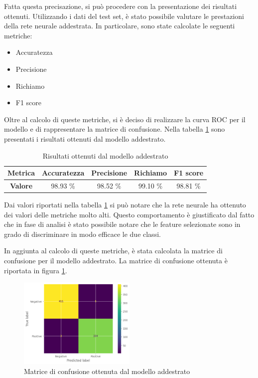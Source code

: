 Fatta questa precisazione, si può procedere con la presentazione dei risultati
ottenuti. Utilizzando i dati del test set, è stato possibile valutare le
prestazioni della rete neurale addestrata. In particolare, sono state calcolate
le seguenti metriche:
\begin{itemize}
    \item Accuratezza
    \item Precisione
    \item Richiamo
    \item F1 score
\end{itemize}
Oltre al calcolo di queste metriche, si è deciso di realizzare la curva ROC per
il modello e di rappresentare la matrice di confusione. Nella tabella
\ref{tab:risultatiReteNeurale} sono presentati i risultati ottenuti dal modello
addestrato.
\begin{table}[!ht]
    \centering
    \begin{tabular}{@{}cllll@{}}
        \toprule
        \rowcolor[HTML]{EFEFEF}
        \textbf{Metrica}                        & \textbf{Accuratezza}         & \textbf{Precisione}          & \textbf{Richiamo}            & \textbf{F1 score}            \\ \midrule
        \cellcolor[HTML]{EFEFEF}\textbf{Valore} & \multicolumn{1}{c}{98.93 \%} & \multicolumn{1}{c}{98.52 \%} & \multicolumn{1}{c}{99.10 \%} & \multicolumn{1}{c}{98.81 \%} \\ \bottomrule
    \end{tabular}
    \caption{Risultati ottenuti dal modello addestrato}
    \label{tab:risultatiReteNeurale}
\end{table}

Dai valori riportati nella tabella \ref{tab:risultatiReteNeurale} si può notare
che la rete neurale ha ottenuto dei valori delle metriche molto alti. Questo
comportamento è giustificato dal fatto che in fase di analisi è stato possibile
notare che le feature selezionate sono in grado di discriminare in modo efficace
le due classi.

In aggiunta al calcolo di queste metriche, è stata calcolata la matrice di confusione
per il modello addestrato. La matrice di confusione ottenuta è riportata in figura
\ref{fig:matriceConfusioneReteNeurale}.

\begin{figure}[!ht]
    \centering
    \includegraphics[width=0.5\textwidth]{img/rete/matrice_confusione.png}
    \caption{Matrice di confusione ottenuta dal modello addestrato}
    \label{fig:matriceConfusioneReteNeurale}
\end{figure}

